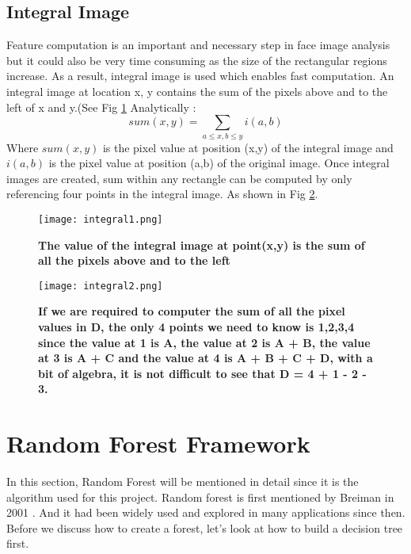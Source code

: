 \subsection{Integral Image}
\label{sec:integralimage}
Feature computation is an important and necessary step in face image analysis but it could also be very time consuming as the size of the rectangular regions increase. As a result, integral image is used which enables fast computation. An integral image at location x, y contains the sum of the pixels above and to the left of x and y.(See Fig \ref{fig:integral1} \cite{integralimage} Analytically : 
\begin{equation}
sum(x,y)= \sum\limits_{a\leq x,b\leq y}i(a,b)
\end{equation}
Where $sum(x,y)$ is the pixel value at position (x,y) of the integral image and $i(a,b)$ is the pixel value at position (a,b) of the original image. Once integral images are created, sum within any rectangle can be computed by only referencing four points in the integral image. As shown in Fig \ref{fig:integral2}.

\begin{figure}
	\centering
	\texttt{[image: integral1.png]}
	\caption[Integral image]{\label{fig:integral1}}  \textbf{The value of the integral image at point(x,y) is the sum of all the pixels above and to the left  } \cite{integralimage}
\end{figure}

\begin{figure}
	\centering
	\texttt{[image: integral2.png]}
	\caption[Integral image referencing]{\label{fig:integral2}}  \textbf{If we are required to computer the sum of all the pixel values in D, the only 4 points we need to know is 1,2,3,4 since the value at 1 is A, the value at 2 is A + B, the value at 3 is A + C and the value at 4 is A + B + C + D, with a bit of algebra, it is not difficult to see that D = 4 + 1 - 2 - 3. }\cite{integralimage} 
\end{figure}



\section{Random Forest Framework}
\label{sec:RF}
In this section, Random Forest will be mentioned in detail since it is the algorithm used for this project. Random forest is first mentioned by Breiman in 2001 \cite{RFML}. And it had been widely used and explored in many applications since then. Before we discuss how to create a forest, let's look at how to build a decision tree first.
